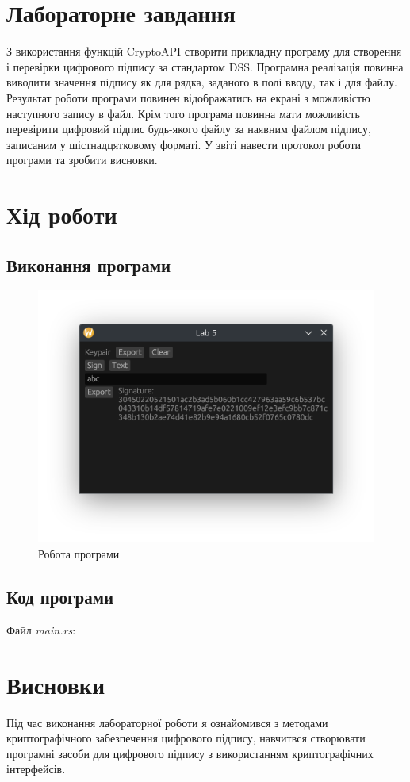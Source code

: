 \documentclass[oneside,14pt]{extarticle}
\begin{document}
\begin{normalsize}
    \section*{Лабораторне завдання}
З використання функцій CryptoAPI створити прикладну програму для
створення і перевірки цифрового підпису за стандартом DSS. Програмна
реалізація повинна виводити значення підпису як для рядка, заданого в полі
вводу, так і для файлу. Результат роботи програми повинен відображатись на
екрані з можливістю наступного запису в файл. Крім того програма повинна
мати можливість перевірити цифровий підпис будь-якого файлу за наявним
файлом підпису, записаним у шістнадцятковому форматі. У звіті навести
протокол роботи програми та зробити висновки.
    
	\section*{Хід роботи}
	
	\subsection*{Виконання програми}
	\begin{figure}[H]
		\centering
		\includegraphics[width=\columnwidth]{1}
		\caption{Робота програми}
	\end{figure}
	
	\subsection*{Код програми}
	Файл \textit{main.rs}:
	{\small	}
	
	\section*{Висновки}
	Під час виконання лабораторної роботи я ознайомився з методами криптографічного забезпечення
	цифрового підпису, навчитвся створювати програмні засоби для цифрового
	підпису з використанням криптографічних інтерфейсів.
	    
\end{normalsize}
\end{document}
